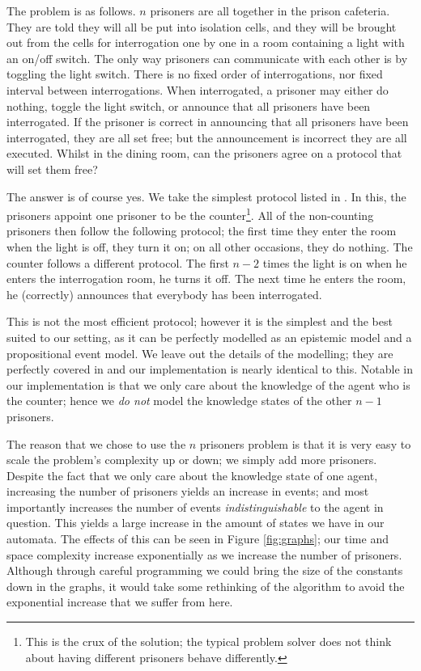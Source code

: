 \documentclass[ %
                    author={Leo Poulson},
                supervisor={Dr. Steven Ramsay},
                    degree={BSc},
                     title={Epistemic Planning for the Dynamic Gossip problem},
                  subtitle={},
                      year={2019} ]{dissertation}
\begin{document}
The problem is as follows. $n$ prisoners are all together in the prison
cafeteria. They are told they will all be put into isolation cells, and they
will be brought out from the cells for interrogation one by one in a room
containing a light with an on/off switch. The only way prisoners can communicate
with each other is by toggling the light switch. There is no fixed order of
interrogations, nor fixed interval between interrogations. When interrogated, a
prisoner may either do nothing, toggle the light switch, or announce that all
prisoners have been interrogated. If the prisoner is correct in announcing that
all prisoners have been interrogated, they are all set free; but the
announcement is incorrect they are all executed. Whilst in the dining room, can
the prisoners agree on a protocol that will set them free? 

The answer is of course yes. We take the simplest protocol listed in
\cite{Prisoners}. In this, the prisoners appoint one prisoner to be the
counter\footnote{This is the crux of the solution; the typical problem solver
  does not think about having different prisoners behave differently.}. All of
the non-counting prisoners then follow the following protocol; the first time
they enter the room when the light is off, they turn it on; on all other
occasions, they do nothing. The counter follows a different protocol. The first
$n - 2$ times the light is on when he enters the interrogation room, he turns it
off. The next time he enters the room, he (correctly) announces that everybody
has been interrogated.

This is not the most efficient protocol; however it is the simplest and the best
suited to our setting, as it can be perfectly modelled as an epistemic model and
a propositional event model. We leave out the details of the modelling; they are
perfectly covered in \cite{Prisoners} and our implementation is nearly identical
to this. Notable in our implementation is that we only care about the knowledge
of the agent who is the counter; hence we \emph{do not} model the knowledge
states of the other $n - 1$ prisoners. 

The reason that we chose to use the $n$ prisoners problem is that it is very easy
to scale the problem's complexity up or down; we simply add more prisoners.
Despite the fact that we only care about the knowledge state of one agent,
increasing the number of prisoners yields an increase in events; and most
importantly increases the number of events \emph{indistinguishable} to the agent
in question. This yields a large increase in the amount of states we have in our
automata. The effects of this can be seen in Figure \ref{fig:graphs}; our time
and space complexity increase exponentially as we increase the number of
prisoners. Although through careful programming we could bring the size of the
constants down in the graphs, it would take some rethinking of the algorithm to
avoid the exponential increase that we suffer from here.
\end{document}
